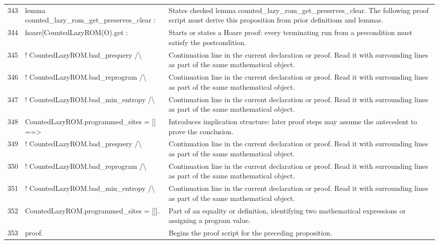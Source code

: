 \documentclass[10pt]{article}
\begin{document}
\begin{longtable}{r L{0.53\textwidth} L{0.37\textwidth}}
343 & {\ttfamily\scriptsize lemma counted\_lazy\_rom\_get\_preserves\_clear :} & States checked lemma counted\_lazy\_rom\_get\_preserves\_clear.  The following proof script must derive this proposition from prior definitions and lemmas. \\
344 & {\ttfamily\scriptsize   hoare[CountedLazyROM(O).get :} & Starts or states a Hoare proof: every terminating run from a precondition must satisfy the postcondition. \\
345 & {\ttfamily\scriptsize     ! CountedLazyROM.bad\_prequery /\textbackslash{}} & Continuation line in the current declaration or proof.  Read it with surrounding lines as part of the same mathematical object. \\
346 & {\ttfamily\scriptsize     ! CountedLazyROM.bad\_reprogram /\textbackslash{}} & Continuation line in the current declaration or proof.  Read it with surrounding lines as part of the same mathematical object. \\
347 & {\ttfamily\scriptsize     ! CountedLazyROM.bad\_min\_entropy /\textbackslash{}} & Continuation line in the current declaration or proof.  Read it with surrounding lines as part of the same mathematical object. \\
348 & {\ttfamily\scriptsize     CountedLazyROM.programmed\_sites = [] ==>} & Introduces implication structure: later proof steps may assume the antecedent to prove the conclusion. \\
349 & {\ttfamily\scriptsize     ! CountedLazyROM.bad\_prequery /\textbackslash{}} & Continuation line in the current declaration or proof.  Read it with surrounding lines as part of the same mathematical object. \\
350 & {\ttfamily\scriptsize     ! CountedLazyROM.bad\_reprogram /\textbackslash{}} & Continuation line in the current declaration or proof.  Read it with surrounding lines as part of the same mathematical object. \\
351 & {\ttfamily\scriptsize     ! CountedLazyROM.bad\_min\_entropy /\textbackslash{}} & Continuation line in the current declaration or proof.  Read it with surrounding lines as part of the same mathematical object. \\
352 & {\ttfamily\scriptsize     CountedLazyROM.programmed\_sites = []].} & Part of an equality or definition, identifying two mathematical expressions or assigning a program value. \\
353 & {\ttfamily\scriptsize proof.} & Begins the proof script for the preceding proposition. \\

\end{longtable}
\end{document}
